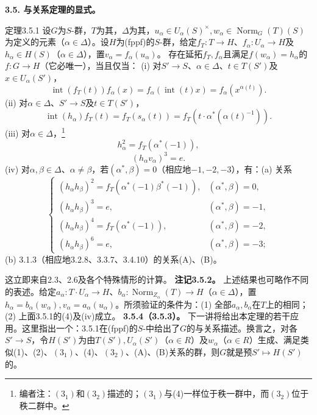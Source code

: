 \textbf{3.5. 与关系定理的显式。}
\begin{SGAresult}{定理}{3.5.1}
设$G$为$S$-群，$T$为其，$\Delta$为其，$u_\alpha\in U_\alpha(S)^\times,w_\alpha\in\operatorname{Norm}_G(T)(S)$为定义的元素（$\alpha\in\Delta$）。设$H$为(fppf)的$S$-群，给定$f_T:T\to H$、$f_\alpha:U_\alpha\to H$及$h_\alpha\in H(S)$（$\alpha\in\Delta$），置$v_\alpha=f_\alpha(u_\alpha)$。
存在延拓$f_T,f_\alpha$且满足$f(w_\alpha)=h_\alpha$的$f:G\to H$（它必唯一），当且仅当：
(i) 对$S'\to S$、$\alpha\in\Delta$、$t\in T(S')$及$x\in U_\alpha(S')$，
\[\operatorname{int}(f_T(t))f_\alpha(x)=f_\alpha(\operatorname{int}(t)x)=f_\alpha(x^{\alpha(t)}).\tag{1}\]
(ii) 对$\alpha\in\Delta$、$S'\to S$及$t\in T(S')$，
\[\operatorname{int}(h_\alpha)f_T(t)=f_T(s_\alpha(t))=f_T(t\cdot\alpha^*(\alpha(t)^{-1})).\tag{2}\]
(iii) 对$\alpha\in\Delta$，\footnote{编者注：$(3_1)$和$(3_2)$描述的；$(3_1)$与(4)一样位于秩一群中，而$(3_2)$位于秩二群中。}
\[h_\alpha^2=f_T(\alpha^*(-1)),\tag{$3_1$}\]
\[(h_\alpha v_\alpha)^3=e.\tag{4}\]
(iv) 对$\alpha,\beta\in\Delta$、$\alpha\ne\beta$，若$(\alpha^*,\beta)=0$（相应地$-1,-2,-3$），有：(a) 关系
\[\begin{cases}(h_\alpha h_\beta)^2=f_T(\alpha^*(-1)\beta^*(-1)),&(\alpha^*,\beta)=0,\\(h_\alpha h_\beta)^3=e,&(\alpha^*,\beta)=-1,\\(h_\alpha h_\beta)^4=f_T(\alpha^*(-1)),&(\alpha^*,\beta)=-2,\\(h_\alpha h_\beta)^6=e,&(\alpha^*,\beta)=-3;\end{cases}\tag{$3_2$}\]
(b) 3.1.3（相应地3.2.8、3.3.7、3.4.10）的关系(A)、(B)。
\end{SGAresult}
这立即来自2.3、2.6及各个特殊情形的计算。
\textbf{注记3.5.2。} 上述结果也可略作不同的表述。给定$a_\alpha:T\cdot U_\alpha\to H$、$b_\alpha:\operatorname{Norm}_{Z_\alpha}(T)\to H$（$\alpha\in\Delta$），置$h_\alpha=b_\alpha(w_\alpha),v_\alpha=a_\alpha(u_\alpha)$。所须验证的条件为：(1) 全部$a_\alpha,b_\alpha$在$T$上的相同；(2) 上面3.5.1的(4)及(iv)成立。
\textbf{3.5.4（3.5.3）。} 下一讲将给出本定理的若干应用。这里指出一个：3.5.1在(fppf)的$S$-中给出了$G$的与关系描述。换言之，对各$S'\to S$，令$H(S')$为由$T(S'),U_\alpha(S')$（$\alpha\in R$）及$w_\alpha$（$\alpha\in R$）生成、满足类似(1)、(2)、$(3_1)$、(4)、$(3_2)$、(A)、(B)关系的群，则$G$就是预$S'\mapsto H(S')$的。
